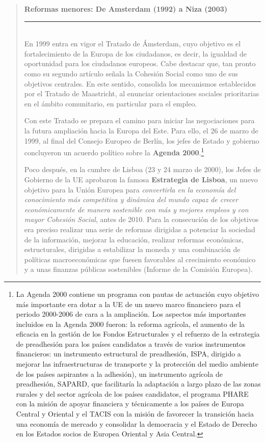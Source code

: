 \documentclass[10pt,a4paper]{article}
\newenvironment{specialblock}[1]{%
      \begin{quote} %
      \small %
      \noindent\textbf{#1}\\[-0.3em] %
      \rule{\linewidth}{0.4pt}\\[0.6em]}{
      \end{quote}}
\begin{document}
\begin{specialblock}{Reformas menores: De Amsterdam (1992) a Niza (2003)}
    En 1999 entra en vigor el Tratado de Ámsterdam, cuyo objetivo es el fortalecimiento de la Europa de los ciudadanos, es decir, la igualdad de oportunidad para los ciudadanos europeos. Cabe destacar que, tan pronto como su segundo artículo señala la Cohesión Social como uno de sus objetivos centrales. En este sentido, consolida los mecanismos establecidos por el Tratado de Maastricht, al enunciar orientaciones sociales prioritarias en el ámbito comunitario, en particular para el empleo.

    Con este Tratado se prepara el camino para iniciar las negociaciones para la futura ampliación hacia la Europa del Este. Para ello, el 26 de marzo de 1999, al final del Consejo Europeo de Berlín, los jefes de Estado y gobierno concluyeron un acuerdo político sobre la \textbf{Agenda 2000}.\footnote{%
        La Agenda 2000 contiene un programa con pautas de actuación cuyo objetivo más importante era dotar a la UE de un nuevo marco financiero para el periodo 2000-2006 de cara a la ampliación. Los aspectos más importantes incluidos en la Agenda 2000 fueron: la reforma agrícola, el aumento de la eficacia en la gestión de los Fondos Estructurales y el refuerzo de la estrategia de preadhesión para los países candidatos a través de varios instrumentos financieros: un instrumento estructural de preadhesión, ISPA, dirigido a mejorar las infraestructuras de transporte y la protección del medio ambiente de los países aspirantes a la adhesión), un instrumento agrícola de preadhesión, SAPARD, que facilitaría la adaptación a largo plazo de las zonas rurales y del sector agrícola de los países candidatos, el programa PHARE con la misión de apoyar financiera y técnicamente a los países de Europa Central y Oriental y el TACIS con la misión de favorecer la transición hacia una economía de mercado y consolidar la democracia y el Estado de Derecho en los Estados socios de Europea Oriental y Asia Central.
    }
    
    Poco después, en la cumbre de Lisboa (23 y 24 marzo de 2000), los Jefes de Gobierno de la UE aprobaron la famosa \textbf{Estrategia de Lisboa}, un nuevo objetivo para la Unión Europea para \textit{convertirla en la economía del conocimiento más competitiva y dinámica del mundo capaz de crecer económicamente de manera sostenible con más y mejores empleos y con mayor Cohesión Social}, antes de 2010. Para la consecución de los objetivos era preciso realizar una serie de reformas dirigidas a potenciar la sociedad de la información, mejorar la educación, realizar reformas económicas, estructurales, dirigidas a estabilizar la moneda y una combinación de políticas macroeconómicas que fuesen favorables al crecimiento económico y a unas finanzas públicas sostenibles (Informe de la Comisión Europea).
    

\end{specialblock}
\end{document}
